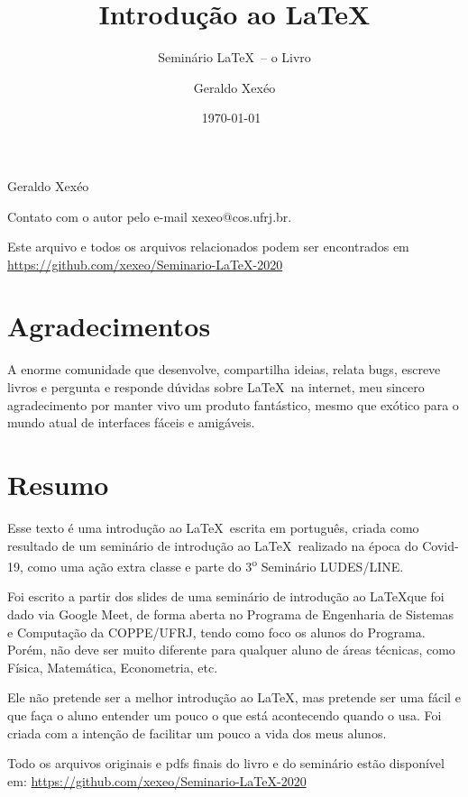 \documentclass[12pt,a4paper]{book}
\title{Introdução ao \LaTeX}
\subtitle{Seminário \LaTeX\ -- o Livro}
\author[1,2]{Geraldo Xexéo}
\affil[1]{Departamento de Ciências da Computação -- IM/UFRJ}
\affil[2]{Programa de Engenharia de Sistemas e Computação -- COPPE/UFRJ}
\date{\today ~ \currenttime}
\begin{document}
\maketitle



\thispagestyle{empty}

Geraldo Xexéo

Contato com o autor pelo e-mail xexeo@cos.ufrj.br. 

\doclicenseThis

Este arquivo e todos os arquivos relacionados podem ser encontrados em
\url{https://github.com/xexeo/Seminario-LaTeX-2020}

\tableofcontents

\chapter*{Agradecimentos}

A enorme comunidade que desenvolve, compartilha ideias, relata bugs, escreve livros e pergunta e responde dúvidas sobre \LaTeX\ na internet, meu sincero agradecimento por manter vivo um produto fantástico, mesmo que exótico para o mundo atual de interfaces fáceis e amigáveis.

\chapter*{Resumo}
    Esse texto é uma introdução ao \LaTeX\  escrita em português, criada como resultado de um seminário de introdução ao \LaTeX\  realizado na época do Covid-19, como uma ação extra classe e parte do 3\textsuperscript{o} Seminário LUDES/LINE.
    
    Foi escrito a partir dos slides de uma seminário de introdução ao \LaTeX que foi dado via Google Meet, de forma aberta no Programa de Engenharia de Sistemas e Computação da COPPE/UFRJ, tendo como foco os alunos do Programa. Porém, não deve ser muito diferente para qualquer aluno de áreas técnicas, como Física, Matemática, Econometria, etc.
    
    Ele não pretende ser a melhor introdução ao \LaTeX, mas pretende ser uma fácil e que faça o aluno entender um pouco o que está acontecendo quando o usa. Foi criada com a intenção de facilitar um pouco a vida dos meus alunos.
    
    Todo os arquivos originais e pdfs finais do livro e do  seminário estão disponível em: \url{https://github.com/xexeo/Seminario-LaTeX-2020}             
    
\end{document}
